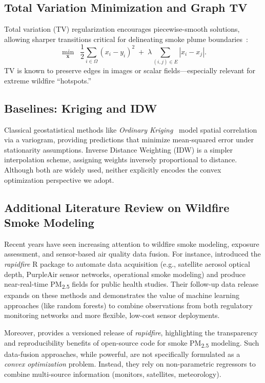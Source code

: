 \documentclass[12pt]{article}                                %
\begin{document}
\subsection{Total Variation Minimization and Graph TV}   %
Total variation (TV) regularization encourages piecewise-smooth solutions, allowing sharper 
transitions critical for delineating smoke plume boundaries~\cite{RudinOsherFatemi}:
\begin{equation}
    \label{eq:tv-smoothing}
    \min_{\mathbf{x}} \;\; \frac12\sum_{i \in \Omega} (x_i - y_i)^2 
    \;+\;\lambda \sum_{(i,j)\in E} |x_i - x_j|.
\end{equation}
TV is known to preserve edges in images or scalar fields—especially relevant for extreme 
wildfire “hotspots.”

\subsection{Baselines: Kriging and IDW}  %
Classical geostatistical methods like \textit{Ordinary Kriging}~\cite{ChilesDelfiner} model 
spatial correlation via a variogram, providing predictions that minimize mean-squared error 
under stationarity assumptions. Inverse Distance Weighting (IDW) is a simpler interpolation 
scheme, assigning weights inversely proportional to distance. Although both are widely used, 
neither explicitly encodes the convex optimization perspective we adopt.

\subsection{Additional Literature Review on Wildfire Smoke Modeling}  %
\label{sec:litreview}
Recent years have seen increasing attention to wildfire smoke modeling, exposure assessment, 
and sensor-based air quality data fusion. For instance, \cite{rapidfireGithub} introduced the 
\emph{rapidfire} R package to automate data acquisition (e.g., satellite aerosol optical depth, 
PurpleAir sensor networks, operational smoke modeling) and produce near-real-time PM\textsubscript{2.5} 
fields for public health studies. Their follow-up data release \cite{rapidfireSupportCode} 
expands on these methods and demonstrates the value of machine learning approaches (like random 
forests) to combine observations from both regulatory monitoring networks and more flexible, 
low-cost sensor deployments.

Moreover, \cite{rapidfireZenodo2023v013} provides a versioned release of \emph{rapidfire}, 
highlighting the transparency and reproducibility benefits of open-source code for smoke 
PM\textsubscript{2.5} modeling. Such data-fusion approaches, while powerful, are not 
specifically formulated as a \textit{convex optimization} problem. Instead, they rely on 
non-parametric regressors to combine multi-source information (monitors, satellites, meteorology). 
\end{document}
